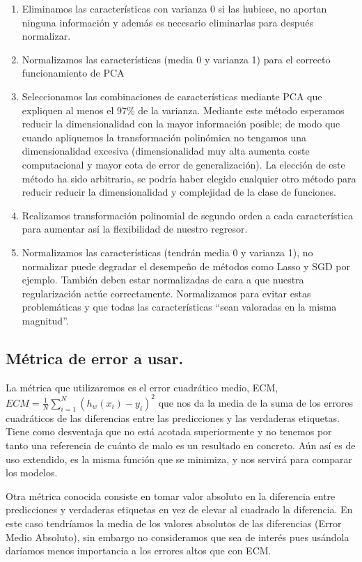 \documentclass[11pt,a4paper]{article}
\theoremstyle{definition}
\begin{document}
\begin{enumerate}
		\item Eliminamos las características con varianza 0 si las hubiese, no aportan ninguna información y además es necesario eliminarlas para después normalizar.
		\item Normalizamos las características (media 0 y varianza 1) para el correcto funcionamiento de PCA
		\item Seleccionamos las combinaciones de características mediante PCA que expliquen al menos el 97\% de la varianza. Mediante este método esperamos reducir la dimensionalidad con la mayor información posible; de modo que cuando apliquemos la transformación polinómica no tengamos una dimensionalidad excesiva (dimensionalidad muy alta aumenta coste computacional y mayor cota de error de generalización).
		La elección de este método ha sido arbitraria, se podría haber elegido cualquier otro método para reducir reducir la dimensionalidad y complejidad de la clase de funciones.
		\item Realizamos transformación polinomial de segundo orden a cada característica para aumentar así la flexibilidad de nuestro regresor.
		\item Normalizamos las características (tendrán media 0 y varianza 1), no normalizar puede degradar el desempeño de métodos como Lasso y SGD por ejemplo. También deben estar normalizadas de cara a que nuestra regularización actúe correctamente. Normalizamos para evitar estas problemáticas y que todas las características ``sean valoradas en la misma magnitud''.
		\end{enumerate}
	\subsection{Métrica de error a usar.}
	La métrica que utilizaremos es el error cuadrático medio, ECM, $ECM= \frac{1}{N} \sum_{i=1}^N (h_w(x_i)-y_i)^2$ que nos da la media de la suma de los errores cuadráticos de las diferencias entre las predicciones y las verdaderas etiquetas. Tiene como desventaja que no está acotada superiormente y no tenemos por tanto una referencia de cuánto de malo es un resultado en concreto. Aún así es de uso extendido, es la misma función que se minimiza, y nos servirá para comparar los modelos.
	
	Otra métrica conocida consiste en tomar valor absoluto en la diferencia entre predicciones y verdaderas etiquetas en vez de elevar al cuadrado la diferencia. En este caso tendríamos la media de los valores absolutos de las diferencias (Error Medio Absoluto), sin embargo no consideramos que sea de interés pues usándola daríamos menos importancia a los errores altos que con ECM.
\end{document}
